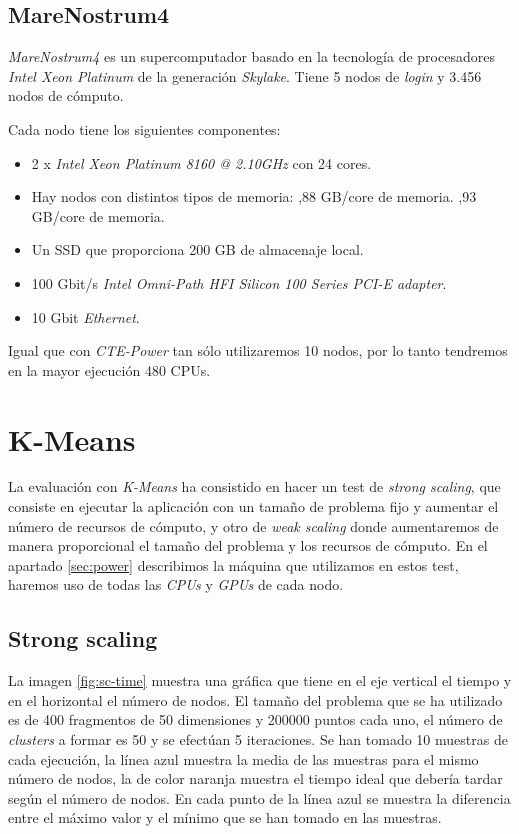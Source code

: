 \subsection{MareNostrum4}
\label{sec:mare}

\textit{MareNostrum4} es un supercomputador basado en la tecnología de procesadores \textit{Intel Xeon Platinum} de la generación \textit{Skylake}. Tiene 5 nodos de \textit{login} y 3.456 nodos de cómputo.
\par\smallskip
Cada nodo tiene los siguientes componentes:
\par\smallskip
\begin{itemize}
	\item 2 x \textit{Intel Xeon Platinum 8160 @ 2.10GHz} con 24 cores.
	\item Hay nodos con distintos tipos de memoria:
		,88 GB/core de memoria. %
		,93 GB/core de memoria.
	\item Un SSD que proporciona 200 GB de almacenaje local.
	\item 100 Gbit/s \textit{Intel Omni-Path HFI Silicon 100 Series PCI-E adapter}.
	\item 10 Gbit \textit{Ethernet}.
\end{itemize}

Igual que con \textit{CTE-Power} tan sólo utilizaremos 10  nodos, por lo tanto tendremos en la mayor ejecución 480 CPUs.

\section{K-Means}

La evaluación con \textit{K-Means} ha consistido en hacer un test de \textit{strong scaling}, que consiste en ejecutar la aplicación con un tamaño de problema fijo y aumentar el número de recursos de cómputo, y otro de \textit{weak scaling} donde aumentaremos de manera proporcional el tamaño del problema y los recursos de cómputo. En el apartado \ref{sec:power} describimos la máquina que utilizamos en estos test, haremos uso de todas las \textit{CPUs} y \textit{GPUs} de cada nodo.

\subsection{Strong scaling}

La imagen \ref{fig:sc-time} muestra una gráfica que tiene en el eje vertical el tiempo y en el horizontal el número de nodos. El tamaño del problema que se ha utilizado es de 400 fragmentos de 50 dimensiones y 200000 puntos cada uno, el número de \textit{clusters} a formar es 50 y se efectúan 5 iteraciones. Se han tomado 10 muestras de cada ejecución, la línea azul muestra la media de las muestras para el mismo número de nodos, la de color naranja muestra el tiempo ideal que debería tardar según el número de nodos. En cada punto de la línea azul se muestra la diferencia entre el máximo valor y el mínimo que se han tomado en las muestras.

